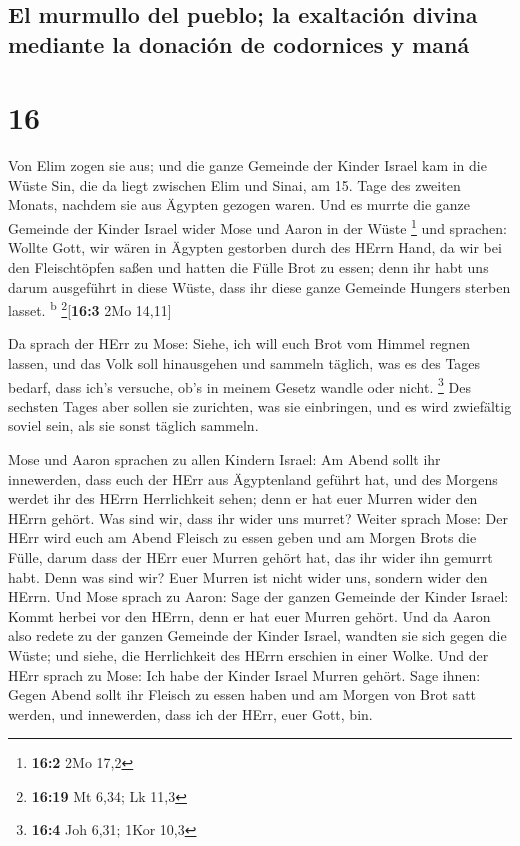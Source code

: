 \hypertarget{el-murmullo-del-pueblo-la-exaltaciuxf3n-divina-mediante-la-donaciuxf3n-de-codornices-y-manuxe1}{%
\subsection{El murmullo del pueblo; la exaltación divina mediante la
donación de codornices y
maná}\label{el-murmullo-del-pueblo-la-exaltaciuxf3n-divina-mediante-la-donaciuxf3n-de-codornices-y-manuxe1}}

\hypertarget{section-15}{%
\section{16}\label{section-15}}

 Von Elim zogen sie aus; und die ganze Gemeinde der Kinder
Israel kam in die Wüste Sin, die da liegt zwischen Elim und Sinai, am
15. Tage des zweiten Monats, nachdem sie aus Ägypten gezogen waren.
 Und es murrte die ganze Gemeinde der Kinder Israel wider
Mose und Aaron in der Wüste \footnote{\textbf{16:2} 2Mo 17,2}
 und sprachen: Wollte Gott, wir wären in Ägypten gestorben
durch des HErrn Hand, da wir bei den Fleischtöpfen saßen und hatten die
Fülle Brot zu essen; denn ihr habt uns darum ausgeführt in diese Wüste,
dass ihr diese ganze Gemeinde Hungers sterben lasset.
\textsuperscript{b} \footnote{\textbf{16:19} Mt 6,34; Lk 11,3}{[}\textbf{16:3}
2Mo 14,11{]}

 Da sprach der HErr zu Mose: Siehe, ich will euch Brot vom
Himmel regnen lassen, und das Volk soll hinausgehen und sammeln täglich,
was es des Tages bedarf, dass ich's versuche, ob's in meinem Gesetz
wandle oder nicht. \footnote{\textbf{16:4} Joh 6,31; 1Kor 10,3}
 Des sechsten Tages aber sollen sie zurichten, was sie
einbringen, und es wird zwiefältig soviel sein, als sie sonst täglich
sammeln.

 Mose und Aaron sprachen zu allen Kindern Israel: Am Abend
sollt ihr innewerden, dass euch der HErr aus Ägyptenland geführt hat,
 und des Morgens werdet ihr des HErrn Herrlichkeit sehen;
denn er hat euer Murren wider den HErrn gehört. Was sind wir, dass ihr
wider uns murret?  Weiter sprach Mose: Der HErr wird euch
am Abend Fleisch zu essen geben und am Morgen Brots die Fülle, darum
dass der HErr euer Murren gehört hat, das ihr wider ihn gemurrt habt.
Denn was sind wir? Euer Murren ist nicht wider uns, sondern wider den
HErrn.  Und Mose sprach zu Aaron: Sage der ganzen Gemeinde
der Kinder Israel: Kommt herbei vor den HErrn, denn er hat euer Murren
gehört.  Und da Aaron also redete zu der ganzen Gemeinde
der Kinder Israel, wandten sie sich gegen die Wüste; und siehe, die
Herrlichkeit des HErrn erschien in einer Wolke.  Und der
HErr sprach zu Mose:  Ich habe der Kinder Israel Murren
gehört. Sage ihnen: Gegen Abend sollt ihr Fleisch zu essen haben und am
Morgen von Brot satt werden, und innewerden, dass ich der HErr, euer
Gott, bin.

